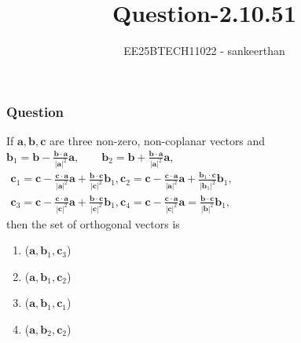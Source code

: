 \documentclass{beamer}
\title{Question-2.10.51}
\author{EE25BTECH11022 - sankeerthan}
\date{}
\begin{document}
\frame{\titlepage}

\begin{frame}
\frametitle{Question}
If $\mathbf{a}, \mathbf{b}, \mathbf{c}$ are three non-zero, non-coplanar vectors and \\

$\mathbf{b}_1 = \mathbf{b} - \frac{\mathbf{b} \cdot \mathbf{a}}{|\mathbf{a}|^2} \mathbf{a}, \qquad \mathbf{b}_2 = \mathbf{b} + \frac{\mathbf{b} \cdot \mathbf{a}}{|\mathbf{a}|^2} \mathbf{a}$, \\
$\begin{aligned}
\mathbf{c}_1 = \mathbf{c} - \frac{\mathbf{c} \cdot \mathbf{a}}{|\mathbf{a}|^2} \mathbf{a} + \frac{\mathbf{b} \cdot \mathbf{c}}{|\mathbf{c}|^2} \mathbf{b}_1, 
\mathbf{c}_2 = \mathbf{c} - \frac{\mathbf{c} \cdot \mathbf{a}}{|\mathbf{a}|^2} \mathbf{a} + \frac{\mathbf{b}_1 \cdot \mathbf{c}}{|\mathbf{b}_1|^2} \mathbf{b}_1, \\
\mathbf{c}_3 = \mathbf{c} - \frac{\mathbf{c} \cdot \mathbf{a}}{|\mathbf{c}|^2} \mathbf{a} + \frac{\mathbf{b} \cdot \mathbf{c}}{|\mathbf{c}|^2} \mathbf{b}_1,
\mathbf{c}_4 = \mathbf{c} - \frac{\mathbf{c} \cdot \mathbf{a}}{|\mathbf{c}|^2} \mathbf{a} = \frac{\mathbf{b} \cdot \mathbf{c}}{|\mathbf{b}|^2} \mathbf{b}_1,
\end{aligned}$ \\

then the set of orthogonal vectors is
\begin{enumerate} 
\item($\mathbf{a}, \mathbf{b}_1, \mathbf{c}_3$) 
\item($\mathbf{a}, \mathbf{b}_1, \mathbf{c}_2$)
\item($\mathbf{a}, \mathbf{b}_1, \mathbf{c}_1$)
\item($\mathbf{a}, \mathbf{b}_2, \mathbf{c}_2$) 
\end{enumerate}
\end{frame}
\end{document}
